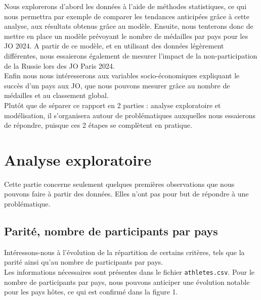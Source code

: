 \documentclass{article}
\begin{document}
Nous explorerons d'abord les données à l'aide de méthodes statistiques, ce qui nous permettra par exemple de comparer les tendances anticipées grâce à cette analyse, aux résultats obtenus grâce au modèle. Ensuite, nous tenterons donc de mettre en place un modèle prévoyant le nombre de médailles par pays pour les JO 2024. A partir de ce modèle, et en utilisant des données légèrement différentes, nous essaierons également de mesurer l'impact de la non-participation de la Russie lors des JO Paris 2024. 
\\

Enfin nous nous intéresserons aux variables socio-économiques expliquant le succès d'un pays aux JO, que nous pouvons mesurer grâce au nombre de médailles et au classement global.
\\

Plutôt que de séparer ce rapport en 2 parties : analyse exploratoire et modélisation, il s'organisera autour de problématiques auxquelles nous essaierons de répondre, puisque ces 2 étapes se complètent en pratique.
\\

\section{Analyse exploratoire}

Cette  partie concerne seulement quelques premières observations que nous pouvons faire à partir des données. Elles n'ont pas pour but de répondre à une problématique. 

\subsection{Parité, nombre de participants par pays}

Intéressons-nous à l'évolution de la répartition de certains critères, tels que la parité ainsi qu'au nombre de participants par pays.
\\

Les informations nécessaires sont présentes dans le fichier \verb|athletes.csv|. Pour le nombre de participants par pays, nous pouvons anticiper une évolution notable pour les pays hôtes, ce qui est confirmé dans la figure 1.
\end{document}
